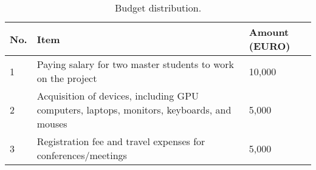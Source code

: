 \begin{table}[h!]
	\centering
	\vspace{-.2cm}
	\footnotesize
	\caption{Budget distribution.}
	\begin{tabular}{| p{0.6cm}|p{9.6cm} | l |}
		\hline
		\textbf{No.}  & \textbf{Item} &  \textbf{Amount (EURO)}  \\ \hline
		1  & Paying salary for two master students to work on the project & 10,000  \\ \hline
		2 & Acquisition of devices, including GPU computers, laptops, monitors, keyboards, and mouses & 5,000 \\ \hline
		3 & Registration fee and travel expenses for conferences/meetings & 5,000 \\ \hline
	\end{tabular}
	\vspace{-.4cm}
	\label{tab:Budget}
\end{table}

%
%
